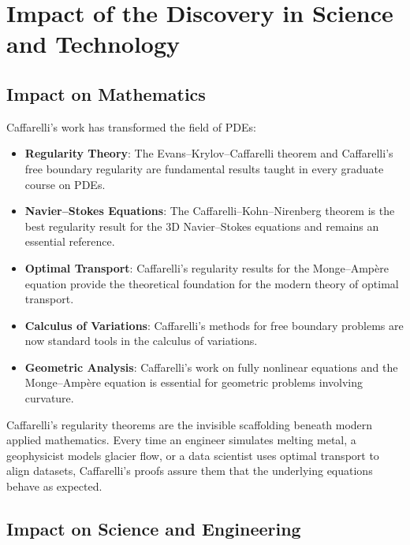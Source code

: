 \section{Impact of the Discovery in Science and Technology}

\subsection{Impact on Mathematics}

Caffarelli's work has transformed the field of PDEs:

\begin{itemize}
\item \textbf{Regularity Theory}: The Evans--Krylov--Caffarelli theorem and Caffarelli's free boundary regularity are fundamental results taught in every graduate course on PDEs.

\item \textbf{Navier--Stokes Equations}: The Caffarelli--Kohn--Nirenberg theorem is the best regularity result for the 3D Navier--Stokes equations and remains an essential reference.

\item \textbf{Optimal Transport}: Caffarelli's regularity results for the Monge--Amp\`ere equation provide the theoretical foundation for the modern theory of optimal transport.

\item \textbf{Calculus of Variations}: Caffarelli's methods for free boundary problems are now standard tools in the calculus of variations.

\item \textbf{Geometric Analysis}: Caffarelli's work on fully nonlinear equations and the Monge--Amp\`ere equation is essential for geometric problems involving curvature.
\end{itemize}

\begin{whyitmatters}
Caffarelli's regularity theorems are the invisible scaffolding beneath modern applied mathematics. Every time an engineer simulates melting metal, a geophysicist models glacier flow, or a data scientist uses optimal transport to align datasets, Caffarelli's proofs assure them that the underlying equations behave as expected.
\end{whyitmatters}

\subsection{Impact on Science and Engineering}

